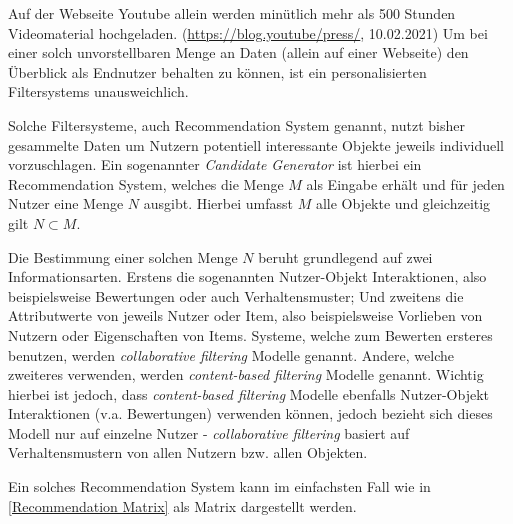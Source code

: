 Auf der Webseite Youtube allein werden minütlich mehr als 500 Stunden Videomaterial hochgeladen. (\url{https://blog.youtube/press/}, 10.02.2021)
Um bei einer solch unvorstellbaren Menge an Daten (allein auf einer Webseite) den Überblick als Endnutzer behalten zu können, ist ein personalisierten Filtersystems unausweichlich.

Solche Filtersysteme, auch Recommendation System genannt, nutzt bisher gesammelte Daten um Nutzern potentiell interessante Objekte jeweils individuell vorzuschlagen.
Ein sogenannter \textit{Candidate Generator} ist hierbei ein Recommendation System, welches die Menge $M$ als Eingabe erhält und für jeden Nutzer eine Menge $N$ ausgibt. Hierbei umfasst $M$ alle Objekte und gleichzeitig gilt $N \subset M$. 

Die Bestimmung einer solchen Menge $N$ beruht grundlegend auf zwei Informationsarten. Erstens die sogenannten Nutzer-Objekt Interaktionen, also beispielsweise Bewertungen oder auch Verhaltensmuster; Und zweitens die Attributwerte von jeweils Nutzer oder Item, also beispielsweise Vorlieben von Nutzern oder Eigenschaften von Items.\cite{aggarwal2016}
Systeme, welche zum Bewerten ersteres benutzen, werden \textit{collaborative filtering} Modelle genannt. Andere, welche zweiteres verwenden, werden \textit{content-based filtering} Modelle genannt. Wichtig hierbei ist jedoch, dass \textit{content-based filtering} Modelle ebenfalls Nutzer-Objekt Interaktionen (v.a. Bewertungen) verwenden können, jedoch bezieht sich dieses Modell nur auf einzelne Nutzer - \textit{collaborative filtering} basiert auf Verhaltensmustern von allen Nutzern bzw. allen Objekten.

Ein solches Recommendation System kann im einfachsten Fall wie in \ref{Recommendation Matrix} als Matrix dargestellt werden.

